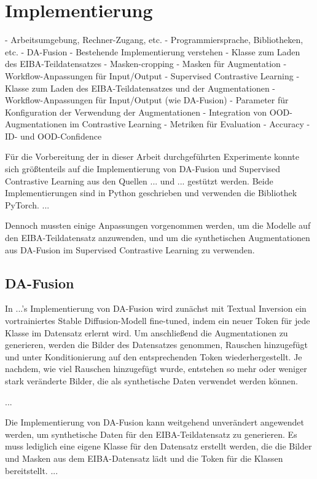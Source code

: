 \section{Implementierung}

- Arbeitsumgebung, Rechner-Zugang, etc.
- Programmiersprache, Bibliotheken, etc.
- DA-Fusion
	- Bestehende Implementierung verstehen
	- Klasse zum Laden des EIBA-Teildatensatzes
		- Masken-cropping
		- Masken für Augmentation
	- Workflow-Anpassungen für Input/Output
- Supervised Contrastive Learning
	- Klasse zum Laden des EIBA-Teildatensatzes und der Augmentationen
	- Workflow-Anpassungen für Input/Output (wie DA-Fusion)
	- Parameter für Konfiguration der Verwendung der Augmentationen
	- Integration von OOD-Augmentationen im Contrastive Learning
	- Metriken für Evaluation
		- Accuracy
		- ID- und OOD-Confidence

Für die Vorbereitung der in dieser Arbeit durchgeführten Experimente konnte sich größtenteils auf die Implementierung von DA-Fusion und Supervised Contrastive Learning aus den Quellen ... und ... gestützt werden. Beide Implementierungen sind in Python geschrieben und verwenden die Bibliothek PyTorch. ...

Dennoch mussten einige Anpassungen vorgenommen werden, um die Modelle auf den EIBA-Teildatensatz anzuwenden, und um die synthetischen Augmentationen aus DA-Fusion im Supervised Contrastive Learning zu verwenden.

\subsection{DA-Fusion}

In ...'s Implementierung von DA-Fusion wird zunächst mit Textual Inversion ein vortrainiertes Stable Diffusion-Modell fine-tuned, indem ein neuer Token für jede Klasse im Datensatz erlernt wird. Um anschließend die Augmentationen zu generieren, werden die Bilder des Datensatzes genommen, Rauschen hinzugefügt und unter Konditionierung auf den entsprechenden Token wiederhergestellt. Je nachdem, wie viel Rauschen hinzugefügt wurde, entstehen so mehr oder weniger stark veränderte Bilder, die als synthetische Daten verwendet werden können.

...

Die Implementierung von DA-Fusion kann weitgehend unverändert angewendet werden, um synthetische Daten für den EIBA-Teildatensatz zu generieren. Es muss lediglich eine eigene Klasse für den Datensatz erstellt werden, die die Bilder und Masken aus dem EIBA-Datensatz lädt und die Token für die Klassen bereitstellt. ...


